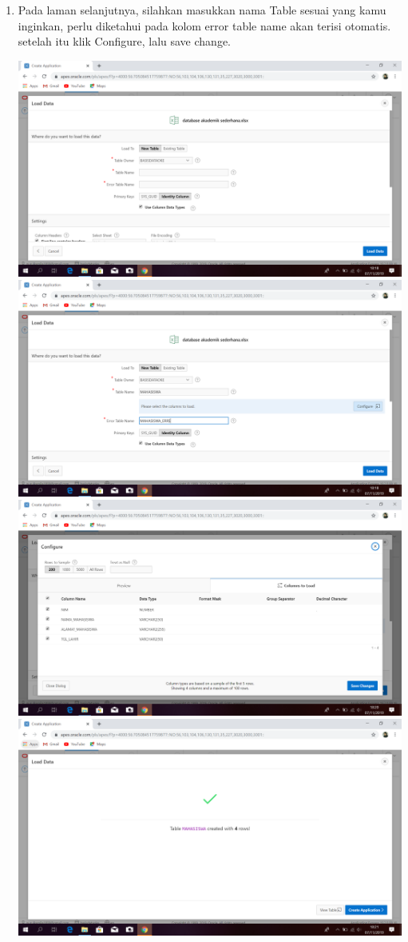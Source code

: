 \documentclass{article}
\begin{document}
\begin{enumerate}
\begin{enumerate}
\begin{center}
    \end{center}
    \item Pada laman selanjutnya, silahkan masukkan nama Table sesuai yang kamu inginkan, perlu diketahui pada kolom error table name akan terisi otomatis. setelah itu klik Configure, lalu save change.
    \begin{center}
    \includegraphics[width=.8\textwidth]{figure/4.PNG}
    \includegraphics[width=.8\textwidth]{figure/5.PNG}
    \includegraphics[width=.8\textwidth]{figure/6.PNG}
    \includegraphics[width=.8\textwidth]{figure/7.PNG}

\end{center}
\end{enumerate}
\end{enumerate}
\end{document}
